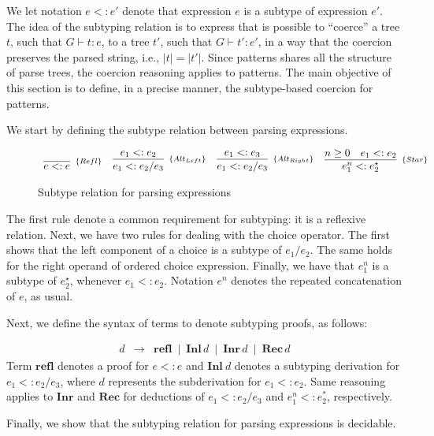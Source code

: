 We let notation $e <: e'$ denote that expression $e$ is a subtype of expression $e'$.
The idea of the subtyping relation is to express that is possible to ``coerce'' a
tree $t$, such that $G \vdash t : e$,  to a tree $t'$, such that $G \vdash t' : e'$,
in a way that the coercion preserves the parsed string, i.e., $|t| = |t'|$.
Since patterns shares all the structure of parse trees, the coercion reasoning
applies to patterns. The main objective of this section is to define, in a precise
manner, the subtype-based coercion for patterns.

We start by defining the subtype relation between parsing expressions.

\begin{figure*}[ht]
    \[
        \begin{array}{cccc}
            \infer[_{\{Refl\}}]{e <: e}{} &
            \infer[_{\{Alt_{Left}\}}]{e_1 <: e_2 / e_3}{e_1 <: e_2} &
            \infer[_{\{Alt_{Right}\}}]{e_1 <: e_2 / e_3}{e_1 <: e_3} &
            \infer[_{\{Star\}}]{e_1^n <: e_2^\star}{n \geq 0 & e_1 <: e_2}
        \end{array}
    \]
    \centering
    \caption{Subtype relation for parsing expressions}
    \label{fig:subtype-relation}
\end{figure*}

The first rule denote a common requirement for subtyping: it is
a reflexive relation. Next, we have two rules for dealing
with the choice operator. The first shows that the left component of a choice
is a subtype of $e_1/e_2$. The same holds for the right operand of ordered choice
expression. Finally, we have that $e_1^n$ is a subtype of $e_2^\star$, whenever
$e_1 <: e_2$. Notation $e^n$ denotes the repeated concatenation of $e$, as usual.

Next, we define the syntax of terms to denote subtyping proofs, as follows:

\[
  \begin{array}{lcl}
    d & \to & \mathbf{refl}
      \: \mid \: \mathbf{Inl}\,d
      \: \mid \: \mathbf{Inr}\,d
      \: \mid \: \mathbf{Rec}\,d
  \end{array}
\]
Term $\mathbf{refl}$ denotes a proof for $e<:e$ and $\mathbf{Inl}\:d$ denotes
a subtyping derivation for $e_1 <:e_2 / e_3$, where $d$ represents the
subderivation for $e_1 <: e_2$. Same reasoning applies to $\mathbf{Inr}$ and
$\mathbf{Rec}$ for deductions of $e_1 <: e_2 / e_3$ and $e_1^n <: e_2^*$,
respectively.

Finally, we show that the subtyping relation for parsing expressions is
decidable.

